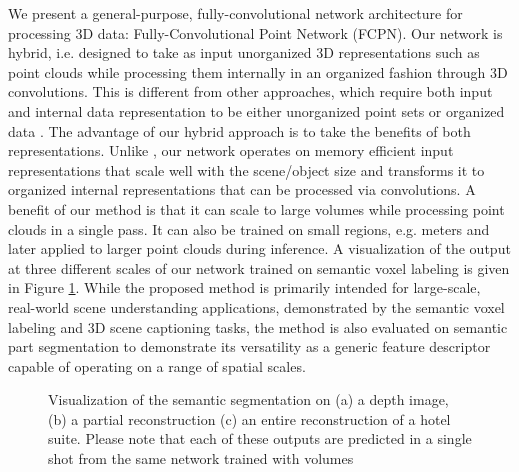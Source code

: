 \documentclass[runningheads]{llncs}
\begin{document}
We present a general-purpose, fully-convolutional network architecture for processing 3D data: Fully-Convolutional Point Network (FCPN). Our network is hybrid, i.e. designed to take as input unorganized 3D representations such as point clouds while processing them internally in an organized fashion through 3D convolutions. This is different from other approaches, which require both input and internal data representation to be either unorganized point sets \cite{Qi2017,Qi2017_2,Manessi2018} or organized data \cite{Song2016,Dai2017}. The advantage of our hybrid approach is to take the benefits of both representations. Unlike \cite{Song2016,Dai2017}, our network operates on memory efficient input representations that scale well with the scene/object size and transforms it to organized internal representations that can be processed via convolutions. 
A benefit of our method is that it can scale to large volumes while processing point clouds in a single pass. It can also be trained on small regions, e.g.  meters and later applied to larger point clouds during inference. A visualization of the output at three different scales of our network trained on semantic voxel labeling is given in Figure \ref{fig:scale_results}.
While the proposed method is primarily intended for large-scale, real-world scene understanding applications, demonstrated by the semantic voxel labeling and 3D scene captioning tasks, the method is also evaluated on semantic part segmentation to demonstrate its versatility as a generic feature descriptor capable of operating on a range of spatial scales.

\begin{figure}[h]\centering
    \caption{Visualization of the semantic segmentation on (a) a depth image, (b) a  partial reconstruction (c) an entire reconstruction of a hotel suite. Please note that each of these outputs are predicted in a single shot from the same network trained with  volumes}\label{fig:scale_results}\end{figure}
\end{document}
